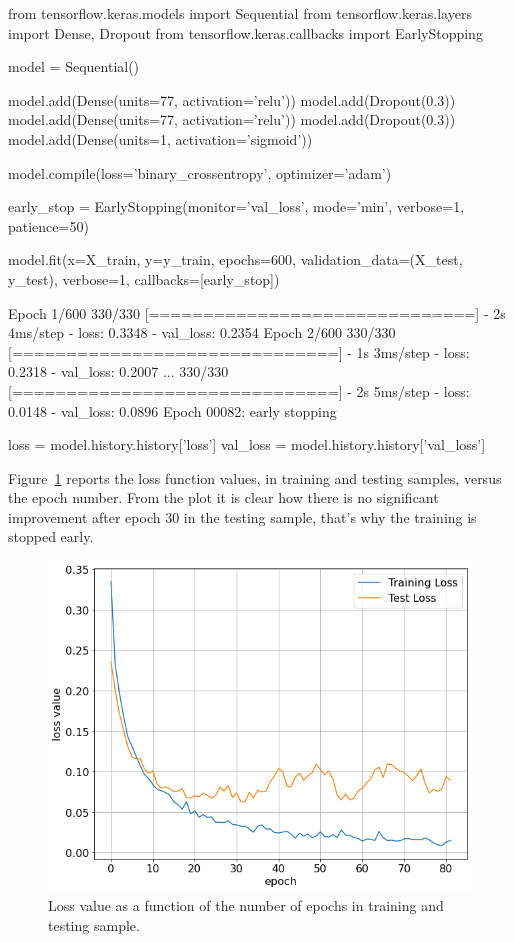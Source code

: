 \begin{ipython}
from tensorflow.keras.models import Sequential
from tensorflow.keras.layers import Dense, Dropout
from tensorflow.keras.callbacks import EarlyStopping
	
model = Sequential()
	
model.add(Dense(units=77, activation='relu'))
model.add(Dropout(0.3))
model.add(Dense(units=77, activation='relu'))
model.add(Dropout(0.3))
model.add(Dense(units=1, activation='sigmoid'))
	
model.compile(loss='binary_crossentropy', optimizer='adam')
	
early_stop = EarlyStopping(monitor='val_loss', 
                           mode='min', 
                           verbose=1, 
                           patience=50)
	
model.fit(x=X_train, y=y_train,
          epochs=600,
          validation_data=(X_test, y_test), 
          verbose=1, callbacks=[early_stop])
\end{ipython}
\begin{ioutput}
Epoch 1/600
330/330 [==============================] - 2s 4ms/step - loss: 0.3348 
- val_loss: 0.2354
Epoch 2/600
330/330 [==============================] - 1s 3ms/step - loss: 0.2318 
- val_loss: 0.2007
...
330/330 [==============================] - 2s 5ms/step - loss: 0.0148 
- val_loss: 0.0896
Epoch 00082: early stopping
\end{ioutput}

\begin{ipython}
loss = model.history.history['loss']
val_loss = model.history.history['val_loss']
\end{ipython}

Figure~\ref{fig:bankruptcy_loss} reports the loss function values, in training and testing samples, versus the epoch number. From the plot it is clear how there is no significant improvement after epoch 30 in the testing sample, that's why the training is stopped early.

\begin{figure}[htbp]
\centering
\includegraphics[width=0.7\linewidth]{figures/bankruptcy_loss}
\caption{Loss value as a function of the number of epochs in training and testing sample.}
\label{fig:bankruptcy_loss}
\end{figure}

